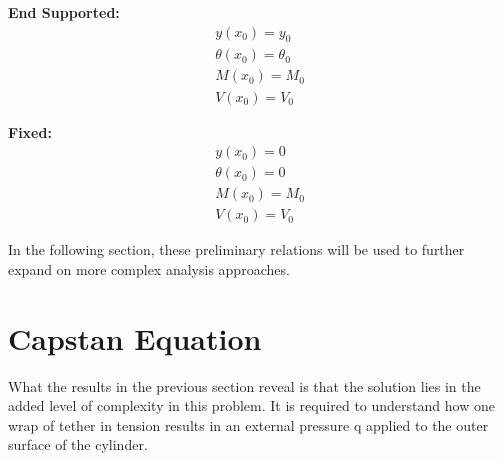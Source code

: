 \textbf{End Supported:}\\
\begin{equation}
	\label{eq:freeBC}
	\begin{aligned}
	y(x_0)=y_0 \\
	\theta(x_0)=\theta_0\\
	M(x_0)=M_0\\
	V(x_0) =V_0 
	\end{aligned}
\end{equation}

\textbf{Fixed:}\\
\begin{equation}
	\label{eq:freeBC}
	\begin{aligned}
	y(x_0)=0 \\
	\theta(x_0)=0\\
	M(x_0)=M_0\\
	V(x_0) =V_0 
	\end{aligned}
\end{equation}

In the following section, these preliminary relations will be used to further expand on more complex analysis approaches.


\section{Capstan Equation}
What the results in the previous section reveal is that the solution lies in the added level of complexity in this problem. It is required to understand how one wrap of tether in tension results in an external pressure q applied to the outer surface of the cylinder.\\

